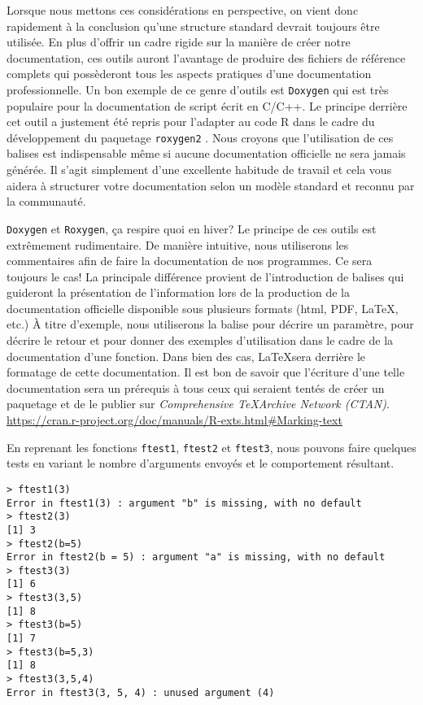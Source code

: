 Lorsque nous mettons ces considérations en perspective, on vient donc rapidement à la conclusion qu'une structure standard devrait toujours être utilisée. En plus d'offrir un cadre rigide sur la manière de créer notre documentation, ces outils auront l'avantage de produire des fichiers de référence complets qui possèderont tous les aspects pratiques d'une documentation professionnelle. Un bon exemple de ce genre d'outils est \texttt{Doxygen} \cite{doxygen} qui est très populaire pour la documentation de script écrit en C/C++. Le principe derrière cet outil a justement été repris pour l'adapter au code R dans le cadre du développement du paquetage \texttt{roxygen2} \cite{roxygen2}. Nous croyons que l'utilisation de ces balises est indispensable même si aucune documentation officielle ne sera jamais générée. Il s'agit simplement d'une excellente habitude de travail et cela vous aidera à structurer votre documentation selon un modèle standard et reconnu par la communauté.\\

\begin{moreInfo}{\texttt{Doxygen} et \texttt{Roxygen}, ça respire quoi en hiver?}
	Le principe de ces outils est extrêmement rudimentaire. De manière intuitive, nous utiliserons les commentaires afin de faire la documentation de nos programmes. Ce sera toujours le cas! La principale différence provient de l'introduction de balises qui guideront la présentation de l'information lors de la production de la documentation officielle disponible sous plusieurs formats (html, PDF, \LaTeX, etc.) À titre d'exemple, nous utiliserons la balise \@param pour décrire un paramètre, \@return pour décrire le retour et \@examples pour donner des exemples d'utilisation dans le cadre de la documentation d'une fonction. Dans bien des cas, \LaTeX  sera derrière le formatage de cette documentation. Il est bon de savoir que l'écriture d'une telle documentation sera un prérequis à tous ceux qui seraient tentés de créer un paquetage et de le publier sur \emph{Comprehensive \TeX Archive Network (CTAN)}. \\
	\url{https://cran.r-project.org/doc/manuals/R-exts.html#Marking-text}
\end{moreInfo}

En reprenant les fonctions \texttt{ftest1}, \texttt{ftest2} et \texttt{ftest3}, nous pouvons faire quelques tests en variant le nombre d'arguments envoyés et le comportement résultant.

\begin{lstlisting}[caption = Passage d'arguments à une fonction,label=src:callFctParam]
> ftest1(3)
Error in ftest1(3) : argument "b" is missing, with no default
> ftest2(3)
[1] 3
> ftest2(b=5)
Error in ftest2(b = 5) : argument "a" is missing, with no default
> ftest3(3)
[1] 6
> ftest3(3,5)
[1] 8
> ftest3(b=5)
[1] 7
> ftest3(b=5,3)
[1] 8
> ftest3(3,5,4)
Error in ftest3(3, 5, 4) : unused argument (4)
\end{lstlisting}

